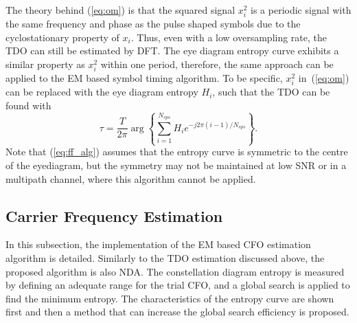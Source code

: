 \documentclass[12pt, draftclsnofoot, onecolumn]{IEEEtran}
\begin{document}
The theory behind (\ref{eq:om}) is that the squared signal \(x_i^2\) is a periodic signal with the same frequency and phase as the pulse shaped symbols due to the cyclostationary property of \(x_i\).
Thus, even with a low oversampling rate, the TDO can still be estimated by DFT.
The eye diagram entropy curve exhibits a similar property as \(x_i^2\) within one period,
therefore, the same approach can be applied to the EM based symbol timing algorithm.
% 
% 
To be specific, \(x_i^2\) in~(\ref{eq:om}) can be replaced  with the eye diagram entropy \(H_i\), 
such that the TDO can be found with
\begin{equation}
\tau  = \frac{T}{{2\pi }}\arg \left\{ {\sum\limits_{i = 1}^{N_{sps}} {H_i{e^{ - j2\pi (i-1)/N_{sps}}}} } \right\}.
\label{eq:ff_alg}
\end{equation}
Note that (\ref{eq:ff_alg}) assumes that the entropy curve is symmetric to the centre of the eyediagram,
but the symmetry may not be maintained at low SNR or in a multipath channel, where this algorithm cannot be applied.

\subsection{Carrier Frequency Estimation}
\label{sec:carrier_recovery}
In this subsection, the implementation of the EM based CFO estimation algorithm is detailed.
Similarly to the TDO estimation discussed above, the proposed algorithm is also NDA.
The constellation diagram entropy is measured by defining an adequate range for the trial CFO, and a global search is applied to find the minimum entropy. 
The characteristics of the entropy curve are shown first and then a method that can increase the global search efficiency is proposed. 
\end{document}

